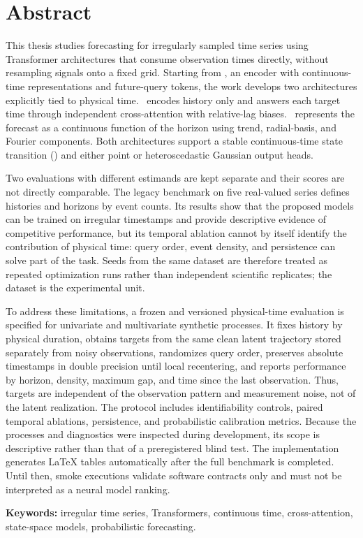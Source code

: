 \chapter*{Abstract}

This thesis studies forecasting for irregularly sampled time series using Transformer architectures that consume observation times directly, without resampling signals onto a fixed grid. Starting from \CTTransformer, an encoder with continuous-time representations and future-query tokens, the work develops two architectures explicitly tied to physical time. \QueryCross\ encodes history only and answers each target time through independent cross-attention with relative-lag biases. \ContinuousBasis\ represents the forecast as a continuous function of the horizon using trend, radial-basis, and Fourier components. Both architectures support a stable continuous-time state transition (\CTSSM) and either point or heteroscedastic Gaussian output heads.

Two evaluations with different estimands are kept separate and their scores are not directly comparable. The legacy benchmark on five real-valued series defines histories and horizons by event counts. Its results show that the proposed models can be trained on irregular timestamps and provide descriptive evidence of competitive performance, but its temporal ablation cannot by itself identify the contribution of physical time: query order, event density, and persistence can solve part of the task. Seeds from the same dataset are therefore treated as repeated optimization runs rather than independent scientific replicates; the dataset is the experimental unit.

To address these limitations, a frozen and versioned physical-time evaluation is specified for univariate and multivariate synthetic processes. It fixes history by physical duration, obtains targets from the same clean latent trajectory stored separately from noisy observations, randomizes query order, preserves absolute timestamps in double precision until local recentering, and reports performance by horizon, density, maximum gap, and time since the last observation. Thus, targets are independent of the observation pattern and measurement noise, not of the latent realization. The protocol includes identifiability controls, paired temporal ablations, persistence, and probabilistic calibration metrics. Because the processes and diagnostics were inspected during development, its scope is descriptive rather than that of a preregistered blind test. The implementation generates LaTeX tables automatically after the full benchmark is completed. Until then, smoke executions validate software contracts only and must not be interpreted as a neural model ranking.

\noindent\textbf{Keywords:} irregular time series, Transformers, continuous time, cross-attention, state-space models, probabilistic forecasting.
